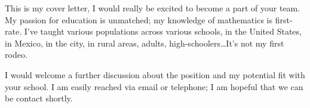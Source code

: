 
This is my cover letter, I would really be excited to become a part of your team.  My passion for education is unmatched; my knowledge of 
mathematics is first-rate.  I've taught various populations across various schools, in the United States, in Mexico, in the city, in rural areas,
adults, high-schoolers\dots It's not my first rodeo.

I would welcome a further discussion about the position and my potential fit with your school.  I am easily reached via email or telephone; 
I am hopeful that we can be contact shortly.


